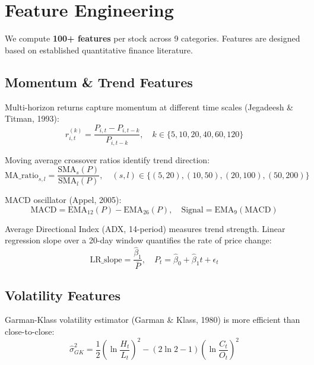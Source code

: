 \documentclass[12pt,a4paper]{article}
\begin{document}
\section{Feature Engineering}

We compute \textbf{100+ features} per stock across 9 categories. Features are designed based on established quantitative finance literature.

\subsection{Momentum \& Trend Features}
Multi-horizon returns capture momentum at different time scales (Jegadeesh \& Titman, 1993):
\begin{equation}
    r_{i,t}^{(k)} = \frac{P_{i,t} - P_{i,t-k}}{P_{i,t-k}}, \quad k \in \{5, 10, 20, 40, 60, 120\}
\end{equation}

Moving average crossover ratios identify trend direction:
\begin{equation}
    \text{MA\_ratio}_{s,l} = \frac{\text{SMA}_s(P)}{\text{SMA}_l(P)}, \quad (s,l) \in \{(5,20), (10,50), (20,100), (50,200)\}
\end{equation}

MACD oscillator (Appel, 2005):
\begin{equation}
    \text{MACD} = \text{EMA}_{12}(P) - \text{EMA}_{26}(P), \quad \text{Signal} = \text{EMA}_9(\text{MACD})
\end{equation}

Average Directional Index (ADX, 14-period) measures trend strength. Linear regression slope over a 20-day window quantifies the rate of price change:
\begin{equation}
    \text{LR\_slope} = \frac{\hat{\beta}_1}{\bar{P}}, \quad P_t = \hat{\beta}_0 + \hat{\beta}_1 t + \epsilon_t
\end{equation}

\subsection{Volatility Features}
Garman-Klass volatility estimator (Garman \& Klass, 1980) is more efficient than close-to-close:
\begin{equation}
    \hat{\sigma}_{GK}^2 = \frac{1}{2}\left(\ln\frac{H_t}{L_t}\right)^2 - (2\ln 2 - 1)\left(\ln\frac{C_t}{O_t}\right)^2
\end{equation}
\end{document}
